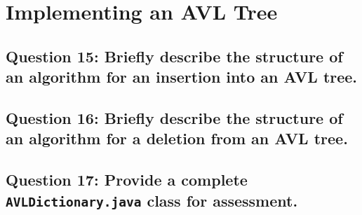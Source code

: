 \documentclass[a4paper, 12pt, titlepage]{article}
\def\code#1{\texttt{#1}}
\begin{document}
\section*{Implementing an AVL Tree}

\subsection*{Question 15: Briefly describe the structure of an algorithm for an insertion into an AVL tree.} 

\subsection*{Question 16: Briefly describe the structure of an algorithm for a deletion from an AVL tree.} 

\subsection*{Question 17: Provide a complete \code{AVLDictionary.java} class for assessment.} 
\end{document}
